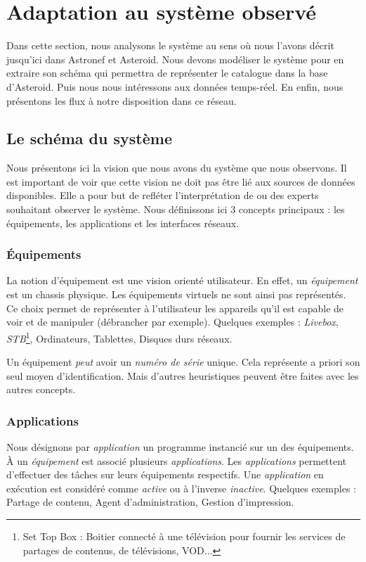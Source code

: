 \section{Adaptation au système observé}\label{sec:valid:domvision:systeme}
Dans cette section, nous analysons le système au sens où nous l'avons décrit jusqu'ici dans Astronef et Asteroid. Nous devons modéliser le système pour en extraire son schéma qui permettra de représenter le catalogue dans la base d'Asteroid. Puis nous nous intéressons aux données temps-réel. En enfin, nous présentons les flux à notre disposition dans ce réseau.

\subsection{Le schéma du système}
Nous présentons ici la vision que nous avons du système que nous observons. Il est important de voir que cette vision ne doit pas être lié aux sources de données disponibles. Elle a pour but de refléter l'interprétation de ou des experts souhaitant observer le système. Nous définissons ici 3 concepts principaux : les équipements, les applications et les interfaces réseaux.

\subsubsection{Équipements}
La notion d'équipement est une vision orienté utilisateur. En effet, un \textit{équipement} est un chassis physique. Les équipements virtuels ne sont ainsi pas représentés. Ce choix permet de représenter à l'utilisateur les appareils qu'il est capable de voir et de manipuler (débrancher par exemple). Quelques exemples : \textit{Livebox}, \textit{STB}\footnote{Set Top Box : Boitier connecté à une télévision pour fournir les services de partages de contenus, de télévisions, VOD...}, Ordinateurs, Tablettes, Disques durs réseaux.

Un équipement \textit{peut} avoir un \textit{numéro de série} unique. Cela représente a priori son seul moyen d'identification. Mais d'autres heuristiques peuvent être faites avec les autres concepts.

\subsubsection{Applications}
Nous désignons par \textit{application} un programme instancié sur un des équipements. À un \textit{équipement} est associé plusieurs \textit{applications}. Les \textit{applications} permettent d'effectuer des tâches sur leurs équipements respectifs. Une \textit{application} en exécution est considéré comme \textit{active} ou à l'inverse \textit{inactive}. Quelques exemples : Partage de contenu, Agent d'administration, Gestion d'impression.

